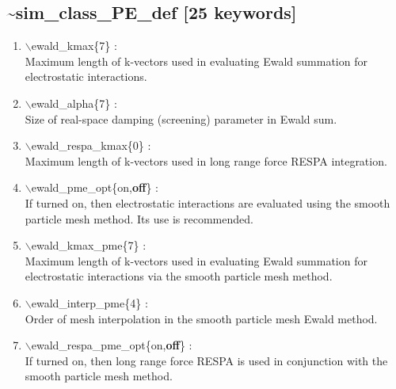 \documentclass[12pt]{article}
\begin{document}
\newpage
\subsection*{\bf \~{}sim\_class\_PE\_def [25 keywords]}

\begin{enumerate}

 \vspace{0.15in} 
 \item   $\backslash$ewald\_kmax\{7\} : \\
  Maximum length of k-vectors used in evaluating Ewald summation for 
  electrostatic interactions.

 \vspace{0.15in} 
 \item   $\backslash$ewald\_alpha\{7\} : \\
  Size of real-space damping (screening) parameter in Ewald sum.

 \vspace{0.15in} 
 \item   $\backslash$ewald\_respa\_kmax\{0\} : \\
   Maximum length of k-vectors used in long range force RESPA integration.

 \vspace{0.15in}
 \item   $\backslash$ewald\_pme\_opt\{on,{\bf off}\} : \\
  If turned on, then electrostatic interactions are evaluated using the
  smooth particle mesh method.  Its use is recommended.

 \vspace{0.15in} 
 \item   $\backslash$ewald\_kmax\_pme\{7\} : \\
  Maximum length of k-vectors used in evaluating Ewald summation for 
  electrostatic interactions via the smooth particle mesh method.

 \vspace{0.15in} 
 \item   $\backslash$ewald\_interp\_pme\{4\} : \\
   Order of mesh interpolation in the smooth particle mesh Ewald method.

 \vspace{0.15in} 
 \item   $\backslash$ewald\_respa\_pme\_opt\{on,{\bf off}\} : \\
  If turned on, then long range force RESPA is used in conjunction with the
  smooth particle mesh method.


\end{enumerate}
\end{document}
